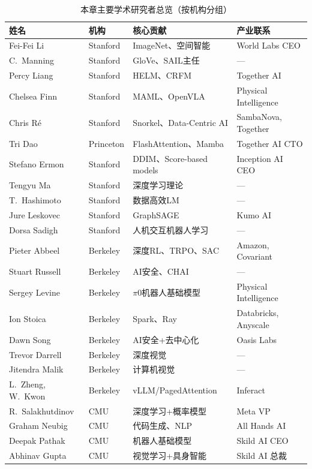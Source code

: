 \begin{table}[htbp]
\centering
\caption{本章主要学术研究者总览（按机构分组）}
\label{tab:academics-summary}
\footnotesize
\begin{tabularx}{\textwidth}{l l X l}
\toprule
\textbf{姓名} & \textbf{机构} & \textbf{核心贡献} & \textbf{产业联系} \\
\midrule
Fei-Fei Li & Stanford & ImageNet、空间智能 & World Labs CEO \\
C.\ Manning & Stanford & GloVe、SAIL主任 & — \\
Percy Liang & Stanford & HELM、CRFM & Together AI \\
Chelsea Finn & Stanford & MAML、OpenVLA & Physical Intelligence \\
Chris R\'{e} & Stanford & Snorkel、Data-Centric AI & SambaNova, Together \\
Tri Dao & Princeton & FlashAttention、Mamba & Together AI CTO \\
Stefano Ermon & Stanford & DDIM、Score-based models & Inception AI CEO \\
Tengyu Ma & Stanford & 深度学习理论 & — \\
T.\ Hashimoto & Stanford & 数据高效LM & — \\
Jure Leskovec & Stanford & GraphSAGE & Kumo AI \\
Dorsa Sadigh & Stanford & 人机交互机器人学习 & — \\
\midrule
Pieter Abbeel & Berkeley & 深度RL、TRPO、SAC & Amazon, Covariant \\
Stuart Russell & Berkeley & AI安全、CHAI & — \\
Sergey Levine & Berkeley & $\pi$0机器人基础模型 & Physical Intelligence \\
Ion Stoica & Berkeley & Spark、Ray & Databricks, Anyscale \\
Dawn Song & Berkeley & AI安全+去中心化 & Oasis Labs \\
Trevor Darrell & Berkeley & 深度视觉 & — \\
Jitendra Malik & Berkeley & 计算机视觉 & — \\
L.\ Zheng, W.\ Kwon & Berkeley & vLLM/PagedAttention & Inferact \\
\midrule
R.\ Salakhutdinov & CMU & 深度学习+概率模型 & Meta VP \\
Graham Neubig & CMU & 代码生成、NLP & All Hands AI \\
Deepak Pathak & CMU & 机器人基础模型 & Skild AI CEO \\
Abhinav Gupta & CMU & 视觉学习+具身智能 & Skild AI 总裁 \\

\end{tabularx}
\end{table}
